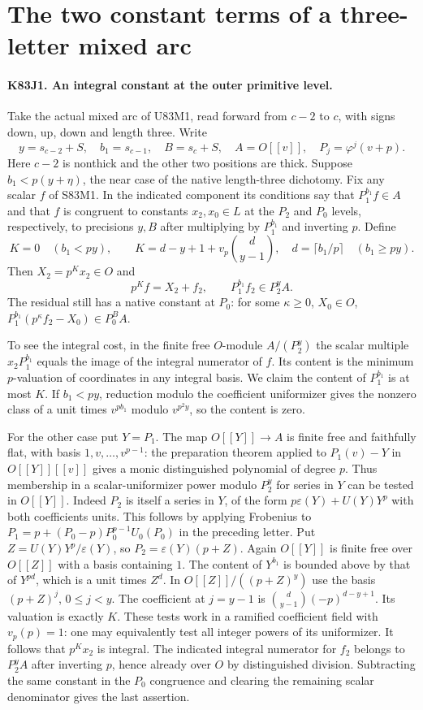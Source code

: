 \section{The two constant terms of a three-letter mixed arc}

\paragraph{K83J1. An integral constant at the outer primitive level.}
Take the actual mixed arc of U83M1, read forward from $c-2$ to
$c$, with signs down, up, down and length three. Write
\[
 y=s_{c-2}+S,\quad b_1=s_{c-1},\quad B=s_c+S,\quad
 A=O[[v]],\quad P_j=\varphi^j(v+p).
\]
Here $c-2$ is nonthick and the other two positions are thick.
Suppose $b_1<p(y+\eta)$, the near case of the native
length-three dichotomy. Fix any scalar $f$ of S83M1.
In the indicated component its conditions say that $P_1^{b_1}f\in A$
and that $f$ is congruent to constants $x_2,x_0\in L$ at the
$P_2$ and $P_0$ levels, respectively, to precisions $y,B$ after
multiplying by $P_1^{b_1}$ and inverting $p$. Define
\[
 K=0\quad(b_1<py),\qquad
 K=d-y+1+v_p\binom d{y-1},\quad
 d=\lceil b_1/p\rceil\quad(b_1\ge py).
\]
Then $X_2=p^K x_2\in O$ and
\[
 p^Kf=X_2+f_2,\qquad P_1^{b_1}f_2\in P_2^y A .
\]
The residual still has a native constant at $P_0$: for some
$\kappa\ge0$, $X_0\in O$,
$P_1^{b_1}(p^\kappa f_2-X_0)\in P_0^B A$.

To see the integral cost, in the finite free $O$-module
$A/(P_2^y)$ the scalar multiple $x_2P_1^{b_1}$ equals the
image of the integral numerator of $f$. Its content is the
minimum $p$-valuation of coordinates in any integral basis.
We claim the content of $P_1^{b_1}$ is at most $K$.
If $b_1<py$, reduction modulo the coefficient uniformizer gives
the nonzero class of a unit times $v^{pb_1}$ modulo $v^{p^2y}$,
so the content is zero.

For the other case put $Y=P_1$. The map $O[[Y]]\to A$ is
finite free and faithfully flat, with basis $1,v,\ldots,v^{p-1}$:
the preparation theorem applied to $P_1(v)-Y$ in $O[[Y]][[v]]$
gives a monic distinguished polynomial of degree $p$.
Thus membership in a scalar-uniformizer power modulo $P_2^y$
for series in $Y$ can be tested in $O[[Y]]$. Indeed $P_2$ is
itself a series in $Y$, of the form $p\varepsilon(Y)+U(Y)Y^p$
with both coefficients units. This follows by applying Frobenius
to $P_1=p+(P_0-p)P_0^{p-1}U_0(P_0)$ in the preceding letter.
Put $Z=U(Y)Y^p/\varepsilon(Y)$, so $P_2=\varepsilon(Y)(p+Z)$.
Again $O[[Y]]$ is finite free over $O[[Z]]$ with a basis
containing $1$. The content of $Y^{b_1}$ is bounded above by
that of $Y^{pd}$, which is a unit times $Z^d$. In
$O[[Z]]/((p+Z)^y)$ use the basis $(p+Z)^j$, $0\le j<y$.
The coefficient at $j=y-1$ is
$\binom d{y-1}(-p)^{d-y+1}$. Its valuation is exactly $K$.
These tests work in a ramified coefficient field with $v_p(p)=1$:
one may equivalently test all integer powers of its uniformizer.
It follows that $p^Kx_2$ is integral. The indicated integral
numerator for $f_2$ belongs to $P_2^yA$ after inverting $p$,
hence already over $O$ by distinguished division. Subtracting
the same constant in the $P_0$ congruence and clearing the
remaining scalar denominator gives the last assertion.

